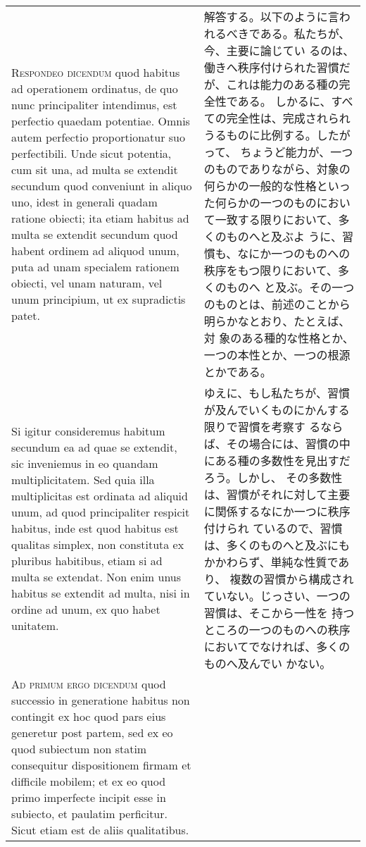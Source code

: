 \documentclass[10pt]{jsarticle}
\begin{document}
\begin{longtable}{p{21em}p{21em}}
\\

{\scshape Respondeo dicendum} quod habitus ad operationem ordinatus,
de quo nunc principaliter intendimus, est perfectio quaedam
potentiae. Omnis autem perfectio proportionatur suo perfectibili. Unde
sicut potentia, cum sit una, ad multa se extendit secundum quod
conveniunt in aliquo uno, idest in generali quadam ratione obiecti;
ita etiam habitus ad multa se extendit secundum quod habent ordinem ad
aliquod unum, puta ad unam specialem rationem obiecti, vel unam
naturam, vel unum principium, ut ex supradictis patet.

&

解答する。以下のように言われるべきである。私たちが、今、主要に論じてい
るのは、働きへ秩序付けられた習慣だが、これは能力のある種の完全性である。
しかるに、すべての完全性は、完成されられうるものに比例する。したがって、
ちょうど能力が、一つのものでありながら、対象の何らかの一般的な性格といっ
た何らかの一つのものにおいて一致する限りにおいて、多くのものへと及ぶよ
うに、習慣も、なにか一つのものへの秩序をもつ限りにおいて、多くのものへ
と及ぶ。その一つのものとは、前述のことから明らかなとおり、たとえば、対
象のある種的な性格とか、一つの本性とか、一つの根源とかである。

\\

Si igitur consideremus habitum secundum ea ad quae se extendit, sic
inveniemus in eo quandam multiplicitatem. Sed quia illa multiplicitas
est ordinata ad aliquid unum, ad quod principaliter respicit habitus,
inde est quod habitus est qualitas simplex, non constituta ex pluribus
habitibus, etiam si ad multa se extendat. Non enim unus habitus se
extendit ad multa, nisi in ordine ad unum, ex quo habet unitatem.

&

ゆえに、もし私たちが、習慣が及んでいくものにかんする限りで習慣を考察す
るならば、その場合には、習慣の中にある種の多数性を見出すだろう。しかし、
その多数性は、習慣がそれに対して主要に関係するなにか一つに秩序付けられ
ているので、習慣は、多くのものへと及ぶにもかかわらず、単純な性質であり、
複数の習慣から構成されていない。じっさい、一つの習慣は、そこから一性を
持つところの一つのものへの秩序においてでなければ、多くのものへ及んでい
かない。

\\

{\scshape Ad primum ergo dicendum} quod successio in generatione
habitus non contingit ex hoc quod pars eius generetur post partem, sed
ex eo quod subiectum non statim consequitur dispositionem firmam et
difficile mobilem; et ex eo quod primo imperfecte incipit esse in
subiecto, et paulatim perficitur. Sicut etiam est de aliis
qualitatibus.


\end{longtable}
\end{document}
